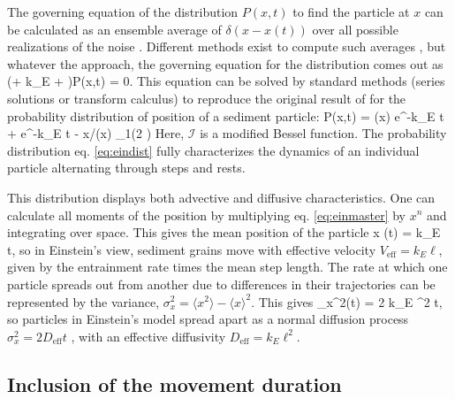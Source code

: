 The governing equation of the distribution $P(x,t)$ to find the particle at $x$ can be calculated as an ensemble average of $\delta(x-x(t))$ over all possible realizations of the noise \citep{Risken1989,Moss1989}. Different methods exist to compute such averages \citep{Hanggi1978, Hanggi1984a, Balakrishnan1993, VanDenBroeck1983}, but whatever the approach, the governing equation for the distribution comes out as
\be  \big(\ell \px \pt + k_E \ell \px + \pt \big)P(x,t) = 0. \label{eq:einmaster}\ee
This equation can be solved by standard methods (series solutions or transform calculus) \citep{Arfken1985,Prudnikov1992a} to reproduce the original result of \citet{Einstein1937} for the probability distribution of position of a sediment particle:
\be P(x,t) = \delta(x) e^{-k_E t} + e^{-k_E t - x/\ell}\theta(x) _1\Big(2 \Big) \ee
Here, $\mathcal{I}$ is a modified Bessel function. 
The probability distribution eq. \ref{eq:eindist} fully characterizes the dynamics of an individual particle alternating through steps and rests. 

This distribution displays both advective and diffusive characteristics.
One can calculate all moments of the position by multiplying eq. \ref{eq:einmaster} by $x^n$ and integrating over space. This gives the mean position of the particle
\be \langle x \rangle (t) = k_E \ell t, \ee
so in Einstein's view, sediment grains move with effective velocity $V_\text{eff} = k_E \ell$, given by the entrainment rate times the mean step length.
The rate at which one particle spreads out from another due to differences in their trajectories can be represented by the variance, $\sigma_x^2  = \langle x^2 \rangle - \langle x \rangle^2$. This gives
\be \sigma_x^2(t) = 2 k_E \ell^2 t, \ee
so particles in Einstein's model spread apart as a normal diffusion process $\sigma_x^2 = 2 D_\text{eff} t$ \citep{Sokolov2012}, with an effective diffusivity $D_\text{eff} = k_E \ell^2.$


\subsection{Inclusion of the movement duration}
\label{sec:lisle}

